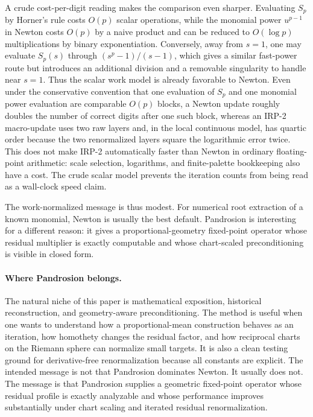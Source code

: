 \documentclass[10pt,a4paper]{article}
\theoremstyle{plain}
\theoremstyle{definition}
\theoremstyle{remark}
\begin{document}
A crude cost-per-digit reading makes the comparison even sharper.  Evaluating
$S_p$ by Horner's rule costs $O(p)$ scalar operations, while the monomial power
$u^{p-1}$ in Newton costs $O(p)$ by a naive product and can be reduced to
$O(\log p)$ multiplications by binary exponentiation.  Conversely, away from
$s=1$, one may evaluate $S_p(s)$ through $(s^p-1)/(s-1)$, which gives a similar
fast-power route but introduces an additional division and a removable
singularity to handle near $s=1$.  Thus the scalar work model is already
favorable to Newton.  Even under the conservative convention that one evaluation
of $S_p$ and one monomial power evaluation are comparable $O(p)$ blocks, a
Newton update roughly doubles the number of correct digits
after one such block, whereas an IRP-2 macro-update uses two raw layers and,
in the local continuous model, has quartic order because the two renormalized
layers square the logarithmic error twice.  This does not make IRP-2
automatically faster than Newton in ordinary floating-point arithmetic: scale
selection, logarithms, and finite-palette bookkeeping also have a cost.  The
crude scalar model prevents the iteration counts from being read as a wall-clock
speed claim.

The work-normalized message is thus modest.  For numerical root extraction of a
known monomial, Newton is usually the best default.  Pandrosion is interesting
for a different reason: it gives a proportional-geometry fixed-point operator
whose residual multiplier is exactly computable and whose chart-scaled
preconditioning is visible in closed form.

\paragraph{Where Pandrosion belongs.}
The natural niche of this paper is mathematical exposition, historical
reconstruction, and geometry-aware preconditioning.  The method is useful when
one wants to understand how a proportional-mean construction behaves as an
iteration, how homothety changes the residual factor, and how reciprocal charts
on the Riemann sphere can normalize small targets.  It is also a clean testing ground for derivative-free renormalization because all
constants are explicit.
The intended message is not that Pandrosion dominates Newton.  It usually does
not.  The message is that Pandrosion supplies a geometric fixed-point operator
whose residual profile is exactly analyzable and whose performance improves
substantially under chart scaling and iterated residual renormalization.
\end{document}
